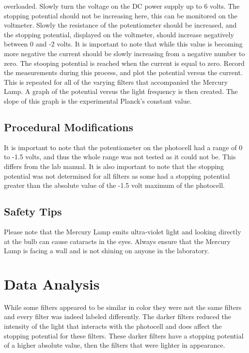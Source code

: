 \documentclass[a4paper]{article}
\begin{document}
overloaded. Slowly turn the voltage on the DC power supply up to 6
volts. The stopping potential should not be increasing here, this can
be monitored on the voltmeter. Slowly the resistance of the
potentiometer should be increased, and the stopping potential,
displayed on the voltmeter, should increase negatively between 0 and
-2 volts. It is important to note that while this value is becoming
more negative the current should be slowly increasing from a negative
number to zero. The stooping potential is reached when the current is
equal to zero. Record the measurements during this process, and plot
the potential versus the current. This is repeated for all of the
varying filters that accompanied the Mercury Lamp. A graph of the
potential versus the light frequency is then created. The slope of
this graph is the experimental Planck's constant value.

\subsection{Procedural Modifications}

\qq It is important to note that the potentiometer on the photocell
had a range of 0 to -1.5 volts, and thus the whole range was not
tested as it could not be. This differs from the lab manual. It is
also important to note that the stopping potential was not determined
for all filters as some had a stopping potential greater than the
absolute value of the -1.5 volt maximum of the photocell.

\subsection{Safety Tips}

\qq Please note that the Mercury Lamp emits ultra-violet light and
looking directly at the bulb can cause cataracts in the eyes. Always
ensure that the Mercury Lamp is facing a wall and is not shining on
anyone in the laboratory.


\section{Data Analysis}


\qq While some filters appeared to be similar in color they were not
the same filters and every filter was indeed labeled differently. The
darker filters reduced the intensity of the light that interacts with
the photocell and does affect the stopping potential for these
filters. These darker filters have a stopping potential of a higher
absolute value, then the filters that were lighter in appearance. 
\end{document}
